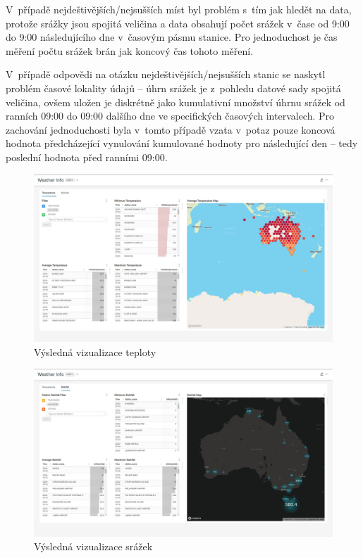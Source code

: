 \documentclass[10pt,a4paper,titlepage]{extarticle}
\begin{document}
    V~případě nejdeštivějších/nejsušších míst byl problém s~tím jak hledět na data, protože srážky jsou spojitá veličina a data obsahují počet srážek v~čase od 9:00 do 9:00 následujícího dne v~časovým pásmu stanice. Pro jednoduchost je čas měření počtu srážek brán jak koncový čas tohoto měření.

    V~případě odpovědi na otázku nejdeštivějších/nejsušších stanic se naskytl problém časové lokality údajů -- úhrn
    srážek je z~pohledu datové sady spojitá veličina, ovšem uložen je diskrétně jako kumulativní množství úhrnu
    srážek od ranních 09:00 do 09:00 dalšího dne ve specifických časových intervalech.
    Pro zachování jednoduchosti byla v~tomto případě vzata v~potaz pouze koncová hodnota předcházející vynulování
    kumulované hodnoty pro následující den -- tedy poslední hodnota před ranními 09:00.
    
    \begin{figure}[H]
        \centering
        \includegraphics[width=.9\textwidth]{Temperature.png}
        \caption{Výsledná vizualizace teploty}
        \label{fig:vizualizace-teploty}
    \end{figure}
    
    \begin{figure}[H]
        \centering
        \includegraphics[width=.9\textwidth]{Rainfall.png}
        \caption{Výsledná vizualizace srážek}
        \label{fig:vizualizace-srazek}
    \end{figure}
    
\end{document}
